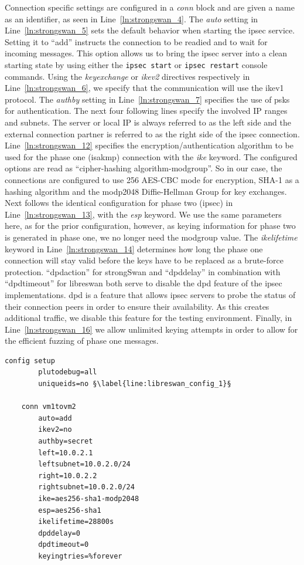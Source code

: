 Connection specific settings are configured in a \emph{conn} block and are given a name as an identifier, as seen in Line~\ref{ln:strongswan_4}. The \emph{auto} setting in Line~\ref{ln:strongswan_5} sets the default behavior when starting the \ac{ipsec} service. Setting it to ``add'' instructs the connection to be readied and to wait for incoming messages. This option allows us to bring the \ac{ipsec} server into a clean starting state by using either the \texttt{ipsec start} or \texttt{ipsec restart} console commands. Using the \emph{keyexchange} or 
\emph{ikev2} directives respectively in Line~\ref{ln:strongswan_6}, we specify that the communication will use the \ac{ike}v1 protocol. The \emph{authby} setting in Line~\ref{ln:strongswan_7} specifies the use of \acp{psk} for authentication. The next four following lines specify the involved IP ranges and subnets. The server or local IP is always referred to as the left side and the external connection partner is referred to as the right side of the \ac{ipsec} connection. Line~\ref{ln:strongswan_12} specifies the encryption/authentication algorithm to be used for the phase one (\ac{isakmp}) connection with the \emph{ike} keyword. The configured options are read as ``cipher-hashing algorithm-modgroup''. So in our case, the connections are configured to use \SI{256}{\bit} AES-CBC mode for encryption, SHA-1 as a hashing algorithm and the modp2048 Diffie-Hellman Group for key exchanges. Next follows the identical configuration for phase two (\ac{ipsec}) in Line~\ref{ln:strongswan_13}, with the \emph{esp} keyword. We use the same parameters here, as for the prior configuration, however, as keying information for phase two is generated in phase one, we no longer need the modgroup value. The \emph{ikelifetime} keyword in Line~\ref{ln:strongswan_14} determines how long the phase one connection will stay valid before the keys have to be replaced as a brute-force protection. ``dpdaction'' for strongSwan and ``dpddelay'' in combination with ``dpdtimeout'' for libreswan both serve to disable the \ac{dpd} feature of the \ac{ipsec} implementations. \ac{dpd} is a feature that allows \ac{ipsec} servers to probe the status of their connection peers in order to ensure their availability. As this creates additional traffic, we disable this feature for the testing environment. Finally, in Line~\ref{ln:strongswan_16} we allow unlimited keying attempts in order to allow for the efficient fuzzing of phase one messages.

\begin{lstlisting}[mathescape=true, float=ht, caption=Configuration options of the libreswan server., label=lst:libreswan_config, escapechar=§]
	config setup
		plutodebug=all
		uniqueids=no §\label{line:libreswan_config_1}§
	
	conn vm1tovm2
		auto=add
		ikev2=no
		authby=secret
		left=10.0.2.1 
		leftsubnet=10.0.2.0/24
		right=10.0.2.2
		rightsubnet=10.0.2.0/24
		ike=aes256-sha1-modp2048
		esp=aes256-sha1
		ikelifetime=28800s
		dpddelay=0
		dpdtimeout=0
		keyingtries=%forever
\end{lstlisting}

